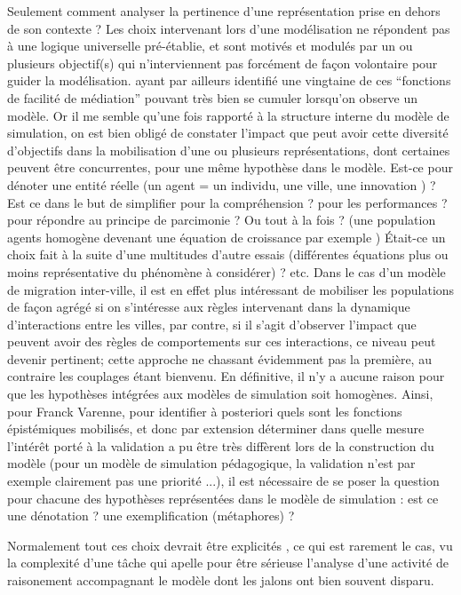 Seulement comment analyser la pertinence d'une représentation prise en dehors de son contexte ? Les choix intervenant lors d'une modélisation ne répondent pas à une logique universelle pré-établie, et sont motivés et modulés par un ou plusieurs objectif(s) qui n’interviennent pas forcément de façon volontaire pour guider la modélisation. \textcite{Varenne2013} ayant par ailleurs identifié une vingtaine de ces \enquote{fonctions de facilité de médiation} pouvant très bien se cumuler lorsqu’on observe un modèle. Or il me semble qu'une fois rapporté à la structure interne du modèle de simulation, on est bien obligé de constater l'impact que peut avoir cette diversité d'objectifs dans la mobilisation d’une ou plusieurs représentations, dont certaines peuvent être concurrentes, pour une même hypothèse dans le modèle. Est-ce pour dénoter une entité réelle (un agent = un individu, une ville, une innovation ) ? Est ce dans le but de simplifier pour la compréhension ? pour les performances ? pour répondre au principe de parcimonie ? Ou tout à la fois ? (une population agents homogène devenant une équation de croissance par exemple ) Était-ce un choix fait à la suite d’une multitudes d'autre essais (différentes équations plus ou moins représentative du phénomène à considérer) ? etc. Dans le cas d'un modèle de migration inter-ville, il est en effet plus intéressant de mobiliser les populations de façon agrégé si on s'intéresse aux règles intervenant dans la dynamique d'interactions entre les villes, par contre, si il s'agit d'observer l'impact que peuvent avoir des règles de comportements sur ces interactions, ce niveau peut devenir pertinent; cette approche ne chassant évidemment pas la première, au contraire les couplages étant bienvenu. En définitive, il n'y a aucune raison pour que les hypothèses intégrées aux modèles de simulation soit homogènes. Ainsi, pour Franck Varenne, pour identifier à posteriori quels sont les fonctions épistémiques mobilisés, et donc par extension déterminer dans quelle mesure l'intérêt porté à la validation a pu être très diffèrent lors de la construction du modèle (pour un modèle de simulation pédagogique, la validation n’est par exemple clairement pas une priorité ...), il est nécessaire de se poser la question pour chacune des hypothèses représentées dans le modèle de simulation : est ce une dénotation ? une exemplification (métaphores) ?

Normalement tout ces choix devrait être explicités \autocite{Varenne2013b}, ce qui est rarement le cas, vu la complexité d'une tâche qui apelle pour être sérieuse l'analyse d'une activité de raisonement accompagnant le modèle dont les jalons ont bien souvent disparu.

